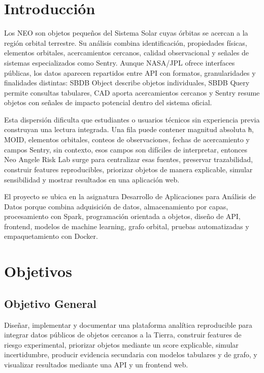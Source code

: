 \documentclass[12pt,a4paper]{report}
\newcommand{\code}[1]{\texttt{#1}}
\begin{document}
\chapter{Introducción}

Los NEO son objetos pequeños del Sistema Solar cuyas órbitas se acercan a la región orbital terrestre. Su análisis combina identificación, propiedades físicas, elementos orbitales, acercamientos cercanos, calidad observacional y señales de sistemas especializados como Sentry. Aunque NASA/JPL ofrece interfaces públicas, los datos aparecen repartidos entre API con formatos, granularidades y finalidades distintas: SBDB Object describe objetos individuales, SBDB Query permite consultas tabulares, CAD aporta acercamientos cercanos y Sentry resume objetos con señales de impacto potencial dentro del sistema oficial.

Esta dispersión dificulta que estudiantes o usuarios técnicos sin experiencia previa construyan una lectura integrada. Una fila puede contener magnitud absoluta \code{h}, MOID, elementos orbitales, conteos de observaciones, fechas de acercamiento y campos Sentry, sin contexto, esos campos son difíciles de interpretar, entonces Neo Angele Risk Lab surge para centralizar esas fuentes, preservar trazabilidad, construir features reproducibles, priorizar objetos de manera explicable, simular sensibilidad y mostrar resultados en una aplicación web.

El proyecto se ubica en la asignatura Desarrollo de Aplicaciones para Análisis de Datos porque combina adquisición de datos, almacenamiento por capas, procesamiento con Spark, programación orientada a objetos, diseño de API, frontend, modelos de machine learning, grafo orbital, pruebas automatizadas y empaquetamiento con Docker.

\chapter{Objetivos}

\section{Objetivo General}

Diseñar, implementar y documentar una plataforma analítica reproducible para integrar datos públicos de objetos cercanos a la Tierra, construir features de riesgo experimental, priorizar objetos mediante un score explicable, simular incertidumbre, producir evidencia secundaria con modelos tabulares y de grafo, y visualizar resultados mediante una API y un frontend web.
\end{document}
